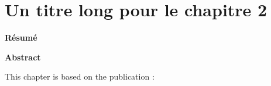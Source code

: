 \ifdefined{}
\else
\setcounter{chapter}{1} %
\dominitoc
\faketableofcontents
\fi

\chapter{Un titre long pour le chapitre 2}
\label{chap:2}

\textbf{Résumé}

\textbf{Abstract}

\begin{cit}
    This chapter is based on the publication \cite{}:
\end{cit}

\clearpage
\minitoc




